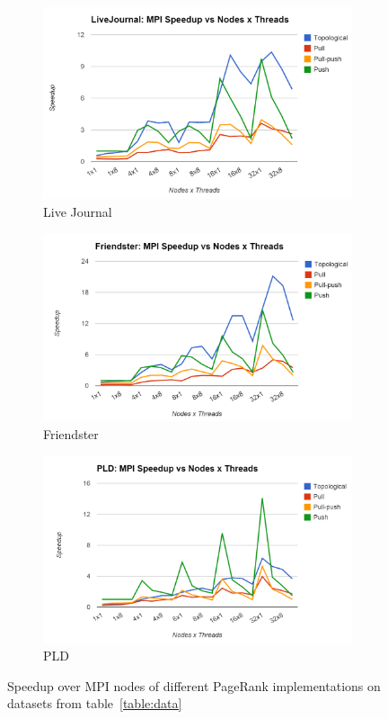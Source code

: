 \documentclass[letterpaper,11pt,onecolumn]{article}
\begin{document}
\begin{figure}
\begin{subfigure}{.33\textwidth}
  \centering
  \includegraphics[width=.99\linewidth]{LiveJournalMPISpeedup}
  \caption{Live Journal}
  \label{fig:lgtime}
\end{subfigure}%
\begin{subfigure}{.33\textwidth}
  \centering
  \includegraphics[width=.99\linewidth]{FriendsterMPISpeedup}
  \caption{Friendster}
  \label{fig:ftime}
\end{subfigure}
\begin{subfigure}{.33\textwidth}
  \centering
  \includegraphics[width=.99\linewidth]{PLDMPISpeedup}
  \caption{PLD}
  \label{fig:ftime}
\end{subfigure}
\caption{Speedup over MPI nodes of different PageRank implementations on datasets from table~\ref{table:data}}
\label{fig:spMPI}
\end{figure}
\end{document}
